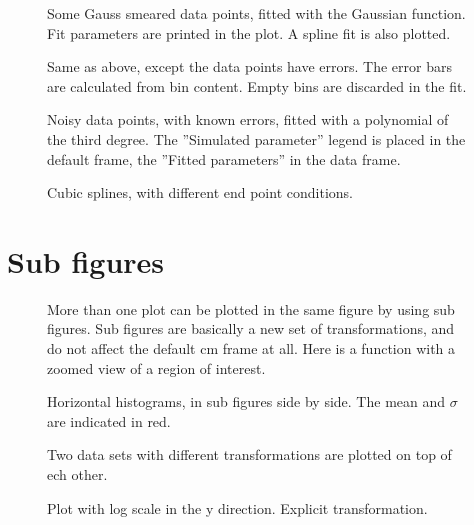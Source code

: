 \documentclass{article}
\begin{document}
\begin{figure}[H]
\centering

\captionsetup{singlelinecheck=off}
\caption[asdf]{Some Gauss smeared data points, fitted with the Gaussian function. Fit parameters are printed in the plot. 
A spline fit is also plotted.}
\end{figure}
\begin{figure}[H]
\centering

\captionsetup{singlelinecheck=off}
\caption[asdf]{Same as above, except the data points have errors. The error bars are calculated from bin content.
Empty bins are discarded in the fit.}
\end{figure}
\begin{figure}[H]
\centering

\captionsetup{singlelinecheck=off}
\caption[asdf]{Noisy data points, with known errors, fitted with a polynomial of the third degree. 
The ''Simulated parameter'' legend is placed in the default frame, the ''Fitted parameters'' 
in the data frame.}
\end{figure}
\begin{figure}[H]
\centering

\captionsetup{singlelinecheck=off}
\caption[asdf]{Cubic splines, with different end point conditions.}
\end{figure}
\section{Sub figures}
\begin{figure}[H]
\centering

\captionsetup{singlelinecheck=off}
\caption[asdf]{More than one plot can be plotted in the same figure by using sub figures.
Sub figures are basically a new set of transformations, and do not affect the default cm frame at all.
Here is a function with a zoomed view of a region of interest.}
\end{figure}
\begin{figure}[H]
\centering

\captionsetup{singlelinecheck=off}
\caption[asdf]{Horizontal histograms, in sub figures side by side. The mean and $\sigma$ are indicated in red.}
\end{figure}
\begin{figure}[H]
\centering

\captionsetup{singlelinecheck=off}
\caption[asdf]{Two data sets with different transformations are plotted on top of ech other.}
\end{figure}
\begin{figure}[H]
\centering

\captionsetup{singlelinecheck=off}
\caption[asdf]{Plot with log scale in the y direction. Explicit transformation.}
\end{figure}
\end{document}
